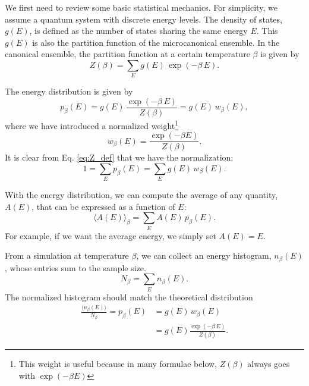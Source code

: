 \documentclass[aip,jcp,preprint,superscriptaddress]{revtex4-1}
\begin{document}
We first need to review some basic statistical mechanics.
%
For simplicity,
we assume a quantum system with discrete energy levels.
%
The density of states, $g(E)$, is defined as the number of states
sharing the same energy $E$.
%
This $g(E)$
is also the partition function of
the microcanonical ensemble.
%
In the canonical ensemble,
the partition function
at a certain temperature $\beta$
is given by
%
\begin{equation}
  Z(\beta) = \sum_E g(E) \, \exp(-\beta \, E).
  \label{eq:Z_def}
\end{equation}



The energy distribution is given by
%
\begin{equation}
  p_\beta(E) = g(E) \, \frac{ \exp(-\beta \, E) } { Z(\beta) }
  = g(E) \, w_\beta(E),
  \label{eq:pE_def}
\end{equation}
%
where we have introduced
a normalized weight\footnote{
This weight is useful
because in many formulae below,
$Z(\beta)$ always goes with $\exp(-\beta E)$}
\begin{equation}
  w_\beta(E) = \frac{ \exp(-\beta E) }{ Z(\beta) }.
\label{eq:wE_def}
\end{equation}
%
It is clear from Eq. \eqref{eq:Z_def}
that we have the normalization:
\begin{equation}
  1 = \sum_E p_\beta(E) = \sum_E g(E) \, w_\beta(E).
  \label{eq:pE_normalization}
\end{equation}
%



With the energy distribution,
we can compute the average of any quantity,
$A(E)$, that can be expressed as a function of $E$:
%
\begin{equation}
  \langle A(E) \rangle_\beta
=
  \sum_E A(E) \, p_\beta(E).
  \label{eq:pE_average}
\end{equation}
%
For example,
if we want the average energy,
we simply set $A(E) = E$.



From a simulation at temperature $\beta$,
we can collect an energy histogram, $n_\beta(E)$,
whose entries sum to the sample size.
%
\begin{equation}
  N_\beta = \sum_E n_\beta(E).
  \label{eq:nE_sum}
\end{equation}
%
The normalized histogram
should match the theoretical distribution
\begin{align}
  \frac{ \langle n_\beta(E) \rangle } { N_\beta }
=
  p_\beta(E)
&=
  g(E) \, w_\beta(E)
\label{eq:nEw}
\\
&=
  g(E) \frac{ \exp(-\beta \, E) } { Z(\beta) }.
\label{eq:nE}
\end{align}
\end{document}
